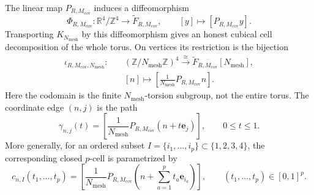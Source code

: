 \begin{proposition}
\label{cusp-link-cubical-realization}
The linear map \(P_{R,M_{\mathrm{cov}}}\) induces a diffeomorphism
\begin{equation}
 \Phi_{R,M_{\mathrm{cov}}}:\mathbb R^4/\mathbb Z^4
 \longrightarrow\widetilde F_{R,M_{\mathrm{cov}}},
 \qquad [y]\longmapsto[P_{R,M_{\mathrm{cov}}}y].
 \label{cusp-link-coordinate-diffeomorphism}
\end{equation}
Transporting \(K_{N_{\mathrm{mesh}}}\) by this diffeomorphism gives an
honest cubical cell decomposition of the whole torus.  On vertices its
restriction is the bijection
\begin{equation}
 \begin{aligned}
 \iota_{R,M_{\mathrm{cov}},N_{\mathrm{mesh}}}:\quad
 &(\mathbb Z/N_{\mathrm{mesh}}\mathbb Z)^4
 \xrightarrow{\ \cong\ }
 \widetilde F_{R,M_{\mathrm{cov}}}[N_{\mathrm{mesh}}],\\
 &[n]\longmapsto
 \left[\frac1{N_{\mathrm{mesh}}}P_{R,M_{\mathrm{cov}}}n\right].
 \end{aligned}
 \label{cusp-link-torsion-bijection}
\end{equation}
Here the codomain is the finite \(N_{\mathrm{mesh}}\)-torsion subgroup,
not the entire torus.  The coordinate edge \((n,j)\) is the path
\begin{equation}
 \gamma_{n,j}(t)=
 \left[
  \frac1{N_{\mathrm{mesh}}}
  P_{R,M_{\mathrm{cov}}}(n+t\mathbf e_j)
 \right],
 \qquad 0\leq t\leq1.
 \label{cusp-link-coordinate-edge}
\end{equation}
More generally, for an ordered subset
\(I=\{i_1,\ldots,i_p\}\subset\{1,2,3,4\}\), the corresponding closed
\(p\)-cell is parametrized by
\begin{equation}
 c_{n,I}(t_1,\ldots,t_p)=
 \left[
  \frac1{N_{\mathrm{mesh}}}P_{R,M_{\mathrm{cov}}}
  \left(n+\sum_{a=1}^pt_a\mathbf e_{i_a}\right)
 \right],
 \qquad (t_1,\ldots,t_p)\in[0,1]^p.
 \label{cusp-link-general-cell}
\end{equation}
\end{proposition}

